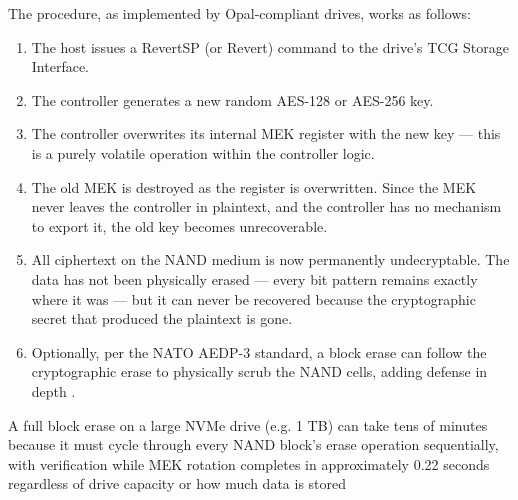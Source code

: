 The procedure, as implemented by Opal-compliant drives, works as follows:
\begin{enumerate}
    \item  The host issues a RevertSP (or Revert) command to the drive's TCG Storage Interface.

    \item The controller generates a new random AES-128 or AES-256 key.

    \item The controller overwrites its internal MEK register with the new key — this is a purely volatile operation within the controller logic.

    \item The old MEK is destroyed as the register is overwritten. Since the MEK never leaves the controller in plaintext, and the controller has no mechanism to export it, the old key becomes unrecoverable.

    \item All ciphertext on the NAND medium is now permanently undecryptable. The data has not been physically erased — every bit pattern remains exactly where it was — but it can never be recovered because the cryptographic secret that produced the plaintext is gone.

    \item Optionally, per the NATO AEDP-3 standard, a block erase can follow the cryptographic erase to physically scrub the NAND cells, adding defense in depth \cite{aronsson2025secure}.
\end{enumerate}



A full block erase on a large NVMe drive (e.g. 1 TB) can take tens of minutes because it must cycle 
through every NAND block's erase operation sequentially, with verification \cite{aronsson2025secure}
while MEK rotation completes in approximately 0.22 seconds regardless of drive capacity or how much data 
is stored

